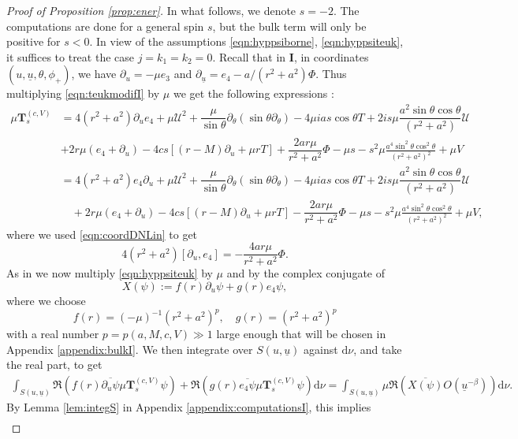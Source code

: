 \documentclass[reqno]{amsart}
\numberwithin{equation}{section}
\newcommand{\Real}{\mathfrak{R}}
\newcommand{\ubar}{{\underline{u}}}
\newcommand{\dee}{\mathrm{d}}
\newcommand{\teuk}{\mathbf{T}}
\theoremstyle{plain}
\theoremstyle{definition}
\theoremstyle{remark}
\numberwithin{equation}{section}
\begin{document}
\begin{proof}[Proof of Proposition \ref{prop:ener}]
In what follows, we denote $s=-2$. The computations are done for a general spin $s$, but the bulk term will only be positive for $s< 0$. In view of the assumptions \eqref{eqn:hyppsiborne}, \eqref{eqn:hyppsiteuk}, it suffices to treat the case $j=k_1=k_2=0$. Recall that in $\mathbf{I}$, in coordinates $(u,\ubar,\theta,\phi_{+})$, we have $\partial_u=-\mu e_3$ and $\partial_\ubar=e_4-a/(r^2+a^2)\Phi$. Thus multiplying \eqref{eqn:teukmodifI} by $\mu$ we get the following expressions :
\begin{align}
    \mu\teuk_s^{(c,V)}&=4(r^2+a^2)\partial_ue_4+\mu \mathcal{U}^2+\dfrac{\mu}{\sin\theta}\partial_\theta(\sin\theta\partial_\theta)-4\mu ias\cos\theta T+2is\mu\dfrac{a^2\sin\theta\cos\theta}{(r^2+a^2)}\mathcal{U}\nonumber\\
    &+2 r\mu (e_4+\partial_u)-4cs[(r-M)\partial_u+\mu rT]+\dfrac{2ar\mu }{r^2+a^2}\Phi-\mu s-s^2\mu\frac{a^4\sin^2\theta\cos^2\theta}{(r^2+a^2)^2}+\mu V\label{eqn:muteuk1}\\
    &=4(r^2+a^2)e_4\partial_u+\mu \mathcal{U}^2+\dfrac{\mu}{\sin\theta}\partial_\theta(\sin\theta\partial_\theta)-4\mu ias\cos\theta T+2is\mu\dfrac{a^2\sin\theta\cos\theta}{(r^2+a^2)}\mathcal{U}\nonumber\\
    &\quad+2 r\mu (e_4+\partial_u)-4cs[(r-M)\partial_u+\mu rT]-\dfrac{2ar\mu }{r^2+a^2}\Phi-\mu s-s^2\mu\frac{a^4\sin^2\theta\cos^2\theta}{(r^2+a^2)^2}+\mu V\label{eqn:muteuk2},
\end{align}
where we used \eqref{eqn:coordDNLin} to get 
$$4(r^2+a^2)[\partial_u,e_4]=-\dfrac{4ar\mu }{r^2+a^2}\Phi.$$
As in \cite{scalarMZ} we now multiply \eqref{eqn:hyppsiteuk} by $\mu$ and by the complex conjugate of $$X(\psi):=f(r)\partial_u\psi+g(r)e_4\psi,$$
where we choose 
$$f(r)=(-\mu)^{-1}(r^2+a^2)^p,\quad g(r)=(r^2+a^2)^p$$
with a real number $p=p(a,M,c,V)\gg1$ large enough that will be chosen in Appendix \ref{appendix:bulkI}. We then integrate over $S(u,\ubar)$ against $\dee\nu$, and take the real part, to get
\begin{align}\label{eqn:teukmult}
    \int_{S(u,\ubar)}\Real(f(r)\overline{\partial_u\psi}\mu\teuk_s^{(c,V)}{\psi})+\Real(g(r)\overline{e_4\psi}\mu\teuk_s^{(c,V)}\psi)\dee\nu=\int_{S(u,\ubar)}\mu\Real(\overline{X(\psi)}O(\ubar^{-\beta}))\dee\nu.
\end{align}
By Lemma \ref{lem:integS} in Appendix \ref{appendix:computationsI}, this implies
\begin{align}\label{eqn:conservationener2}

\end{align}
\end{proof}
\end{document}
